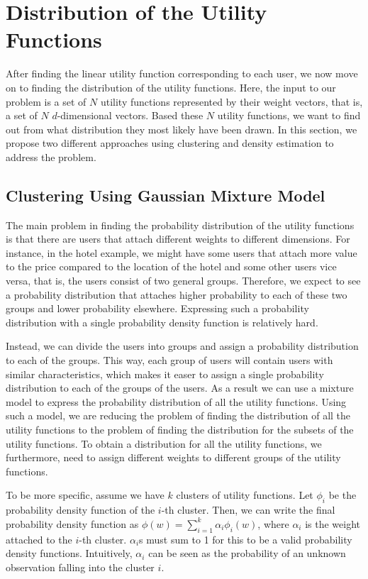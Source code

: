 \section{Distribution of the Utility Functions}
After finding the linear utility function corresponding to each user, we now move on to finding the distribution of the utility functions. Here, the input to our problem is a set of $N$ utility functions represented by their weight vectors, that is, a set of $N$ $d$-dimensional vectors. Based these $N$ utility functions, we want to find out from what distribution they most likely have been drawn. In this section, we propose two different approaches using clustering and density estimation to address the problem.

\subsection{Clustering Using Gaussian Mixture Model}
The main problem in finding the probability distribution of the utility functions is that there are users that attach different weights to different dimensions. For instance, in the hotel example, we might have some users that attach more value to the price compared to the location of the hotel and some other users vice versa, that is, the users consist of two general groups. Therefore, we expect to see a probability distribution that attaches higher probability to each of these two groups and lower probability elsewhere. Expressing such a probability distribution with a single probability density function is relatively hard. 

Instead, we can divide the users into groups and assign a probability distribution to each of the groups. This way, each group of users will contain users with similar characteristics, which makes it easer to assign a single probability distribution to each of the groups of the users. As a result we can use a mixture model to express the probability distribution of all the utility functions. Using such a model, we are reducing the problem of finding the distribution of all the utility functions to the problem of finding the distribution for the subsets of the utility functions. To obtain a distribution for all the utility functions, we furthermore, need to assign different weights to different groups of the utility functions. 

To be more specific, assume we have $k$ clusters of utility functions. Let $\phi_i$ be the probability density function of the $i$-th cluster. Then, we can write the final probability density function as $\phi(w) = \sum_{i = 1}^{k}\alpha_i \phi_i(w)$, where $\alpha_i$ is the weight attached to the $i$-th cluster. $\alpha_i$s must sum to 1 for this to be a valid probability density functions. Intuitively, $\alpha_i$ can be seen as the probability of an unknown observation falling into the cluster $i$. 

